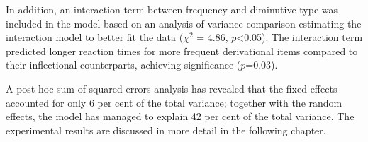 In addition, an interaction term between frequency and diminutive type was included in the model based on an analysis of variance comparison estimating the interaction model to better fit the data ($\chi^2$ = 4.86, $p$<0.05). The interaction term predicted longer reaction times for more frequent derivational items compared to their inflectional counterparts, achieving significance ($p$=0.03). 

A post-hoc sum of squared errors analysis has revealed that the fixed effects accounted for only 6 per cent of the total variance; together with the random effects, the model has managed to explain 42 per cent of the total variance. The experimental results are discussed in more detail in the following chapter.